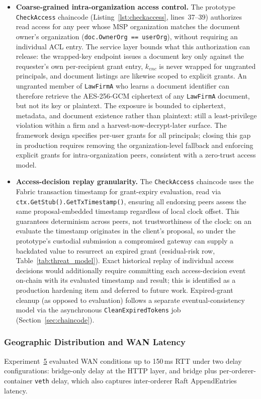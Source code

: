 \documentclass[preprint,12pt]{elsarticle}
\begin{document}
\begin{itemize}
\item \textbf{Coarse-grained intra-organization access control.}
The prototype \texttt{CheckAccess} chaincode (Listing~\ref{lst:checkaccess},
lines~37--39) authorizes read access for any peer whose MSP organization
matches the document owner's organization
(\texttt{doc.OwnerOrg == userOrg}), without requiring an individual
ACL entry. The service layer bounds what this authorization can
release: the wrapped-key endpoint issues a document key only against
the requester's own per-recipient grant entry, $k_{enc}$ is never
wrapped for ungranted principals, and document listings are likewise
scoped to explicit grants. An ungranted member of \texttt{LawFirmA}
who learns a document identifier can therefore retrieve the
AES-256-GCM ciphertext of any \texttt{LawFirmA} document, but not its
key or plaintext. The exposure is bounded to ciphertext, metadata,
and document existence rather than plaintext: still a
least-privilege violation within a firm and a
harvest-now-decrypt-later surface. The framework design specifies
per-user grants for all principals; closing this gap in production
requires removing the organization-level fallback and enforcing
explicit grants for intra-organization peers, consistent with a
zero-trust access model.

\item \textbf{Access-decision replay granularity.}
The \texttt{CheckAccess} chaincode uses the Fabric transaction timestamp
for grant-expiry evaluation, read via
\texttt{ctx.GetStub().}\allowbreak\texttt{GetTxTimestamp()},
ensuring all endorsing peers assess the same proposal-embedded timestamp
regardless of local clock offset. This guarantees determinism across peers,
not trustworthiness of the clock: on an evaluate the timestamp originates
in the client's proposal, so under the prototype's custodial submission a
compromised gateway can supply a backdated value to resurrect an expired
grant (residual-risk row, Table~\ref{tab:threat_model}). Exact historical
replay of individual
access decisions would additionally require committing each
access-decision event on-chain with its evaluated timestamp and result;
this is identified as a production hardening item and deferred to future
work. Expired-grant cleanup (as opposed to evaluation) follows a separate
eventual-consistency model via the asynchronous \texttt{CleanExpiredTokens}
job (Section~\ref{sec:chaincode}).
\end{itemize}

\subsubsection{Geographic Distribution and WAN Latency}
Experiment~\hyperref[sec:exp_wan]{5} evaluated WAN conditions up to 150\,ms RTT under two delay
configurations: bridge-only delay at the HTTP layer, and bridge plus
per-orderer-container \texttt{veth} delay, which also captures inter-orderer
Raft AppendEntries latency.
\end{document}
